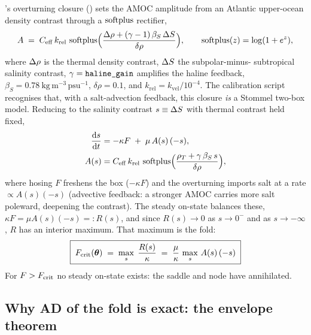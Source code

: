 \model{}'s overturning closure
()
sets the AMOC amplitude from an Atlantic upper-ocean density contrast through a
$\operatorname{softplus}$ rectifier,
\begin{equation}
  A \;=\; C_{\mathrm{eff}}\,k_{\mathrm{rel}}\,
          \operatorname{softplus}\!\Big(\frac{\Delta\rho + (\gamma-1)\,\beta_S\,\Delta S}{\delta\rho}\Big),
  \qquad
  \operatorname{softplus}(z)=\log(1+e^z),
  \label{eq:amocclosure}
\end{equation}
where $\Delta\rho$ is the thermal density contrast, $\Delta S$ the subpolar-minus-
subtropical salinity contrast, $\gamma=\texttt{haline\_gain}$ amplifies the haline
feedback, $\beta_S=0.78\ \mathrm{kg\,m^{-3}\,psu^{-1}}$, $\delta\rho=0.1$, and
$k_{\mathrm{rel}}=k_{\mathrm{vel}}/10^{-4}$. The calibration script
 recognises that, with a salt-advection feedback, this
closure \emph{is} a Stommel two-box model. Reducing to the salinity contrast
$s\equiv\Delta S$ with thermal contrast held fixed,
\begin{align}
  \frac{\mathrm{d}s}{\mathrm{d}t} &= -\kappa F \;+\; \mu\,A(s)\,(-s), \label{eq:boxode}\\
  A(s)   &= C_{\mathrm{eff}}\,k_{\mathrm{rel}}\,
            \operatorname{softplus}\!\Big(\frac{\rho_T + \gamma\,\beta_S\,s}{\delta\rho}\Big),
            \label{eq:boxamoc}
\end{align}
where hosing $F$ freshens the box ($-\kappa F$) and the overturning imports salt
at a rate $\propto A(s)(-s)$ (advective feedback: a stronger AMOC carries more
salt poleward, deepening the contrast). The steady on-state balances these,
$\kappa F = \mu A(s)(-s) =: R(s)$, and since $R(s)\to0$ as $s\to0^-$ and as
$s\to-\infty$, $R$ has an interior maximum. That maximum is the fold:
\begin{equation}
  \boxed{\;F_{\mathrm{crit}}(\boldsymbol{\theta})\;=\;\max_{s}\;\frac{R(s)}{\kappa}
        \;=\;\frac{\mu}{\kappa}\,\max_{s}\,A(s)\,(-s)\;}
  \label{eq:fcrit}
\end{equation}
For $F>F_{\mathrm{crit}}$ no steady on-state exists: the saddle and node have annihilated.

\subsection*{Why AD of the fold is exact: the envelope theorem}

